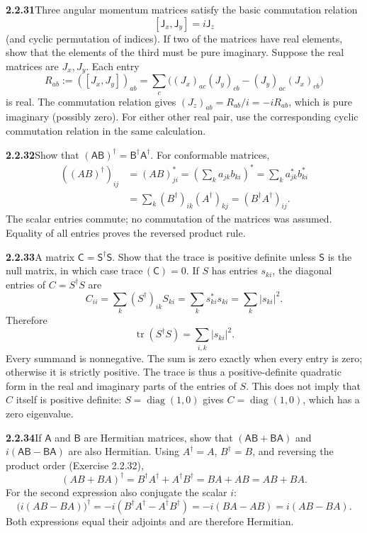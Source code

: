 \par\bigskip
\noindent\textbf{2.2.31}\quad Three angular momentum matrices satisfy the
basic commutation relation
\[
[\mathsf{J}_{x},\mathsf{J}_{y}]=i\mathsf{J}_{z}
\]
(and cyclic permutation of indices). If two of the matrices have real
elements, show that the elements of the third must be pure imaginary.
\solution
Suppose the real matrices are $J_x,J_y$. Each entry
\[
R_{ab}:=([J_x,J_y])_{ab}
=\sum_c\bigl((J_x)_{ac}(J_y)_{cb}-(J_y)_{ac}(J_x)_{cb}\bigr)
\]
is real. The commutation relation gives
$(J_z)_{ab}=R_{ab}/i=-iR_{ab}$, which is pure imaginary
(possibly zero). For either other real pair, use the corresponding
cyclic commutation relation in the same calculation.

\par\bigskip
\noindent\textbf{2.2.32}\quad Show that
$(\mathsf{AB})^{\dagger}=\mathsf{B}^{\dagger}\mathsf{A}^{\dagger}$.
\solution
For conformable matrices,
\[
\begin{aligned}
((AB)^\dagger)_{ij}
&=(AB)_{ji}^*
=\left(\sum_k a_{jk}b_{ki}\right)^*
=\sum_k a_{jk}^*b_{ki}^*\\
&=\sum_k(B^\dagger)_{ik}(A^\dagger)_{kj}
=(B^\dagger A^\dagger)_{ij}.
\end{aligned}
\]
The scalar entries commute; no commutation of the matrices was
assumed. Equality of all entries proves the reversed product rule.

\par\bigskip
\noindent\textbf{2.2.33}\quad A matrix
$\mathsf{C}=\mathsf{S}^{\dagger}\mathsf{S}$. Show that the trace is positive
definite unless $\mathsf{S}$ is the null matrix, in which case
$\mathrm{trace}\,(\mathsf{C})=0$.
\solution
If $S$ has entries $s_{ki}$, the diagonal entries of $C=S^\dagger S$ are
\[
C_{ii}=\sum_k(S^\dagger)_{ik}S_{ki}
=\sum_k s_{ki}^*s_{ki}=\sum_k|s_{ki}|^2.
\]
Therefore
\[
\boxed{\operatorname{tr}(S^\dagger S)=\sum_{i,k}|s_{ki}|^2}.
\]
Every summand is nonnegative. The sum is zero exactly when every
entry is zero; otherwise it is strictly positive. The trace is thus
a positive-definite quadratic form in the real and imaginary parts of
the entries of $S$.
This does not imply that $C$ itself is positive definite:
$S=\operatorname{diag}(1,0)$ gives $C=\operatorname{diag}(1,0)$,
which has a zero eigenvalue.

\par\bigskip
\noindent\textbf{2.2.34}\quad If $\mathsf{A}$ and $\mathsf{B}$ are Hermitian
matrices, show that $(\mathsf{AB}+\mathsf{BA})$ and $i(\mathsf{AB}-\mathsf{BA})$
are also Hermitian.
\solution
Using $A^\dagger=A$, $B^\dagger=B$, and reversing the product order
(Exercise 2.2.32),
\[
(AB+BA)^\dagger=B^\dagger A^\dagger+A^\dagger B^\dagger
=BA+AB=AB+BA.
\]
For the second expression also conjugate the scalar $i$:
\[
\bigl(i(AB-BA)\bigr)^\dagger
=-i(B^\dagger A^\dagger-A^\dagger B^\dagger)
=-i(BA-AB)=i(AB-BA).
\]
Both expressions equal their adjoints and are therefore Hermitian.

